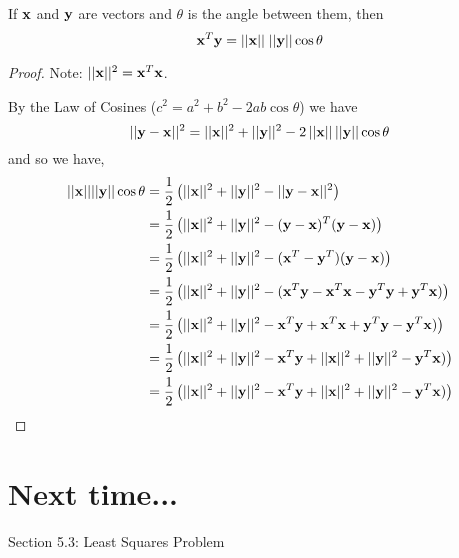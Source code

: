 \begin{theorem}
	If ${\bf x}$ and ${\bf y}$ are vectors and $\theta$ is the angle between them, then
	\[  {\bf x}^T {\bf y}   = || {\bf x} || \;  || {\bf y} || \cos \theta \]
	
	\begin{proof}
		Note: $|| {\bf x}||^2 = {\bf x}^T {\bf x}$.    
		
		
		By the Law of Cosines ($c^2 = a^2 + b^2 - 2ab \cos \theta$) we have
		\[ 			|| {\bf y} - {\bf x} ||^2 = ||{\bf x}||^2 + ||{\bf y}||^2 - 2  \, || {\bf x}||  \, ||{\bf y}|| \cos \theta \] 
		and so we have, 
		\begin{align*}
			 || {\bf x}|| ||{\bf y}|| \cos \theta  &= \frac{1}{2} \left( ||{\bf x}||^2 + ||{\bf y}||^2 - || {\bf y} - {\bf x} ||^2 \right) \\
			 &=  \frac{1}{2} \left( ||{\bf x}||^2 + ||{\bf y}||^2 - ({\bf y} - {\bf x})^T({\bf y} - {\bf x})   \right) \\
&=  \frac{1}{2} \left( ||{\bf x}||^2 + ||{\bf y}||^2 - ({\bf x}^T - {\bf y}^T)({\bf y} - {\bf x})   \right) \\
&=  \frac{1}{2} \left( ||{\bf x}||^2 + ||{\bf y}||^2 - ({\bf x}^T{\bf y}  - {\bf x}^T  {\bf x} - {\bf y}^T {\bf y} + {\bf y}^T {\bf x})   \right) \\
&=  \frac{1}{2} \left( ||{\bf x}||^2 + ||{\bf y}||^2 - {\bf x}^T{\bf y}  + {\bf x}^T  {\bf x} + {\bf y}^T {\bf y} -  {\bf y}^T {\bf x})   \right) \\
&=  \frac{1}{2} \left( ||{\bf x}||^2 + ||{\bf y}||^2 - {\bf x}^T{\bf y}  + ||{\bf x}||^2  +  ||{\bf y}||^2 -  {\bf y}^T {\bf x})   \right) \\
&=  \frac{1}{2} \left( ||{\bf x}||^2 + ||{\bf y}||^2 - {\bf x}^T{\bf y}  + ||{\bf x}||^2  +  ||{\bf y}||^2 -  {\bf y}^T {\bf x})   \right) 
		\end{align*}
	\end{proof}
\end{theorem}




\section*{Next time...}
Section 5.3: Least Squares Problem

